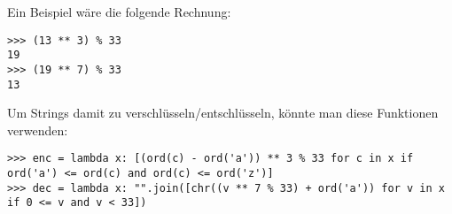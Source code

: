 Ein Beispiel wäre die folgende Rechnung:
\begin{lstlisting}
>>> (13 ** 3) % 33
19
>>> (19 ** 7) % 33
13
\end{lstlisting}

Um Strings damit zu verschlüsseln/entschlüsseln, könnte man diese Funktionen verwenden:
\begin{lstlisting}
>>> enc = lambda x: [(ord(c) - ord('a')) ** 3 % 33 for c in x if ord('a') <= ord(c) and ord(c) <= ord('z')]
>>> dec = lambda x: "".join([chr((v ** 7 % 33) + ord('a')) for v in x if 0 <= v and v < 33])
\end{lstlisting}
